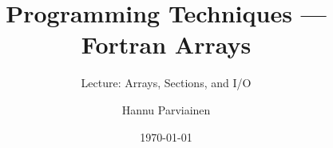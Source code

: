 

\usepackage{tikz}
\usepackage{xcolor}
\usetikzlibrary{positioning,calc}

\title{Programming Techniques — Fortran Arrays}
\subtitle{Lecture: Arrays, Sections, and I/O}
\author{Hannu Parviainen}
\date{\today}


	
	\begin{frame}
		\titlepage
	\end{frame}





